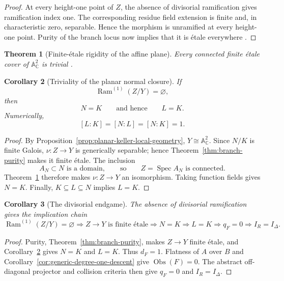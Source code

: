 \documentclass[11pt]{article}
\newtheorem{theorem}{Theorem}[section]
\newtheorem{corollary}[theorem]{Corollary}
\theoremstyle{remark}
\theoremstyle{definition}
\DeclareMathOperator{\Spec}{Spec}
\DeclareMathOperator{\Ram}{Ram}
\newcommand{\A}{\mathbb A}
\newcommand{\C}{\mathbb C}
\newcommand{\Obs}{\operatorname{Obs}}
\begin{document}
\begin{proof}
At every height-one point of \(Z\), the absence of divisorial
ramification gives ramification index one.  The corresponding residue
field extension is finite and, in characteristic zero, separable.
Hence the morphism is unramified at every height-one point.  Purity of
the branch locus now implies that it is \'etale everywhere
\cite{StacksPurity}.
\end{proof}

\begin{theorem}[Finite-\'etale rigidity of the affine plane]
\label{thm:a2-etale-rigidity}
Every connected finite \'etale cover of \(\A^2_{\C}\) is trivial
\cite[Expos\'e XII, Th\'eor\`eme 5.1]{SGA1}.
\end{theorem}

\begin{corollary}[Triviality of the planar normal closure]
\label{cor:planar-normal-closure-trivial}
If
\[
  \Ram^{(1)}(Z/Y)=\varnothing,
\]
then
\[
  N=K
  \qquad\text{and hence}\qquad
  L=K.
\]
Numerically,
\[
  [L:K]=[N:L]=[N:K]=1.
\]
\end{corollary}

\begin{proof}
By Proposition~\ref{prop:planar-keller-local-geometry},
\(Y\cong\A^2_{\C}\).  Since \(N/K\) is finite Galois,
\(\nu\colon Z\to Y\) is generically separable; hence
Theorem~\ref{thm:branch-purity} makes it finite \'etale.  The inclusion
\[
  A_N\subset N\text{ is a domain},
  \qquad\text{so}\qquad
  Z=\Spec A_N\text{ is connected}.
\]
Theorem~\ref{thm:a2-etale-rigidity} therefore makes
\(\nu\colon Z\to Y\) an isomorphism.  Taking function fields gives
\(N=K\).  Finally,
\(K\subseteq L\subseteq N\) implies \(L=K\).
\end{proof}

\begin{corollary}[The divisorial endgame]
\label{cor:planar-ramification-rigidity-route}
The absence of divisorial ramification gives the implication chain
\[
  \Ram^{(1)}(Z/Y)=\varnothing
  \Longrightarrow
  Z\longrightarrow Y\text{ is finite \'{e}tale}
  \Longrightarrow
  N=K
  \Longrightarrow
  L=K
  \Longrightarrow
  q_F=0
  \Longrightarrow
  I_R=I_\Delta.
\]
\end{corollary}

\begin{proof}
Purity, Theorem~\ref{thm:branch-purity}, makes \(Z\to Y\) finite \'{e}tale,
and
Corollary~\ref{cor:planar-normal-closure-trivial} gives \(N=K\) and
\(L=K\).  Thus \(d_F=1\).  Flatness of \(A\) over \(B\) and
Corollary~\ref{cor:generic-degree-one-descent} give \(\Obs(F)=0\).
The abstract off-diagonal projector and collision criteria then give
\(q_F=0\) and \(I_R=I_\Delta\).
\end{proof}
\end{document}
